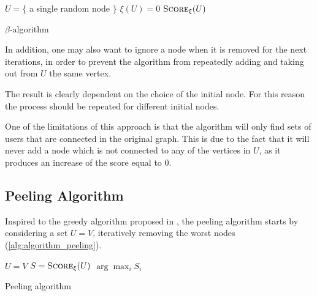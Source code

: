 \begin{algorithm}
	\SetAlgoLined
	$U = \{$ a single random node $\}$\;
	$\xi(U) = 0$ \;
	\Return $\textsc{Score}_{\xi} (U)$ \;
	\caption{$\beta$-algorithm}
	\label{alg:algorithm_beta}
\end{algorithm}

In addition, one may also want to ignore a node when it is removed for the
next iterations, in order to prevent the algorithm from repeatedly adding
and taking out from $U$ the same vertex.

The result is clearly dependent on the choice of the initial node. For this
reason the process should be repeated for different initial nodes.

One of the limitations of this approach is that the algorithm will only find
sets of users that are connected in the original graph. This is due to the fact
that it will never add a node which is not connected to any of the vertices in
$U$, as it produces an increase of the score equal to $0$.

\subsection{Peeling Algorithm}%
\label{ssub:peeling_algorithm}

Inspired to the greedy algorithm proposed in \cite{charikar2000greedy}, the
peeling
algorithm starts by considering a set $U = V$,
iteratively removing the worst nodes (\autoref{alg:algorithm_peeling}).

\begin{algorithm}
	\SetAlgoLined
	$U = V$\;
	$S = \textsc{Score}_{\xi}(U)$ \;
	\Return $\arg\max_{i}S_i$ \;

	\caption{Peeling algorithm}
	\label{alg:algorithm_peeling}
\end{algorithm}

